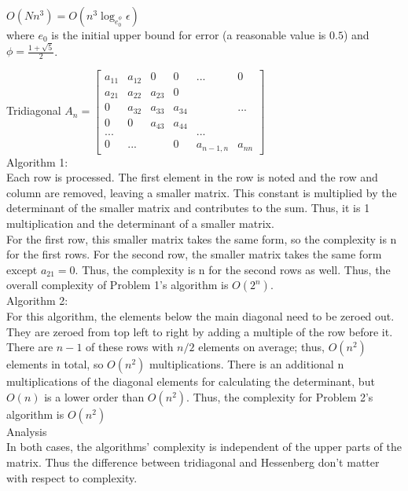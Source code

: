 \documentclass[12pt]{article}
\newenvironment{problem}[2][Problem]{\begin{trivlist}
\item[\hskip \labelsep {\bfseries #1}\hskip \labelsep {\bfseries #2.}]}{\end{trivlist}}
\begin{document}
$O(N n^3)=O(n^3 \log_{e_0^\phi} \epsilon)$
\\

where $e_0$ is the initial upper bound for error (a reasonable value is $0.5$) and $\phi = \frac{1+\sqrt5}{2}$.

\begin{problem}{5}
\end{problem}

Tridiagonal
$
A_n=
  \left[ {\begin{array}{cccccc}
  a_{11} & a_{12} & 0 & 0 & ... & 0 \\
  a_{21} & a_{22} & a_{23} & 0 \\
  0 & a_{32} & a_{33} & a_{34} & & ... \\
  0 & 0 & a_{43} & a_{44} \\
  ... & & & & ... \\
  0 & ... & & 0 & a_{n-1,n}& a_{nn}
  \end{array} } \right]
$
\\

Algorithm 1:
\\

Each row is processed. The first element in the row is noted and the row and column are removed, leaving a smaller matrix. This constant is multiplied by the determinant of the smaller matrix and contributes to the sum. Thus, it is 1 multiplication and the determinant of a smaller matrix.
\\

For the first row, this smaller matrix takes the same form, so the complexity is n for the first rows. For the second row, the smaller matrix takes the same form except $a_{21}=0$. Thus, the complexity is n for the second rows as well. Thus, the overall complexity of Problem 1's algorithm is $O(2^n)$.
\\

Algorithm 2:
\\

For this algorithm, the elements below the main diagonal need to be zeroed out. They are zeroed from top left to right by adding a multiple of the row before it. There are $n-1$ of these rows with $n/2$ elements on average; thus, $O(n^2)$ elements in total, so $O(n^2)$ multiplications. There is an additional n multiplications of the diagonal elements for calculating the determinant, but $O(n)$ is a lower order than $O(n^2)$. Thus, the complexity for Problem 2's algorithm is $O(n^2)$
\\

Analysis
\\
In both cases, the algorithms' complexity is independent of the upper parts of the matrix. Thus the difference between tridiagonal and Hessenberg don't matter with respect to complexity.
\end{document}
